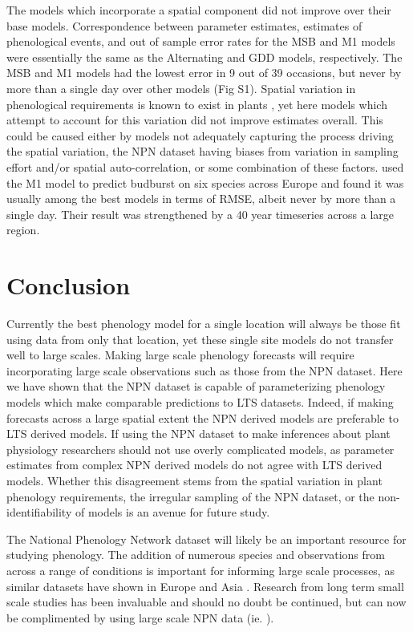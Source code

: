 \documentclass[fleqn,10pt,lineno]{wlpeerj} %
\begin{document}
The models which incorporate a spatial component did not improve over their base models. Correspondence between parameter estimates, estimates of phenological events, and out of sample error rates for the MSB and M1 models were essentially the same as the Alternating and GDD models, respectively. The MSB and M1 models had the lowest error in 9 out of 39 occasions, but never by more than a single day over other models (Fig S1). Spatial variation in phenological requirements is known to exist in plants \citep{zhang2017}, yet here models which attempt to account for this variation did not improve estimates overall. This could be caused either by models not adequately capturing the process driving the spatial variation, the NPN dataset having biases from variation in sampling effort and/or spatial auto-correlation, or some combination of these factors. \cite{basler2016} used the M1 model to predict budburst on six species across Europe and found it was usually among the best models in terms of RMSE, albeit never by more than a single day. Their result was strengthened by a 40 year timeseries across a large region.

\section*{Conclusion}

Currently the best phenology model for a single location will always be those fit using data from only that location, yet these single site models do not transfer well to large scales. Making large scale phenology forecasts will require incorporating large scale observations such as those from the NPN dataset. Here we have shown that the NPN dataset is capable of parameterizing phenology models which make comparable predictions to LTS datasets. Indeed, if making forecasts across a large spatial extent the NPN derived models are preferable to LTS derived models. If using the NPN dataset to make inferences about plant physiology researchers should not use overly complicated models, as parameter estimates from complex NPN derived models do not agree with LTS derived models. Whether this disagreement stems from the spatial variation in plant phenology requirements, the irregular sampling of the NPN dataset, or the non-identifiability of models is an avenue for future study. 

The National Phenology Network dataset will likely be an important resource for studying phenology.  The addition of numerous species and observations from across a range of conditions is important for informing large scale processes, as similar datasets have shown in Europe \citep{olsson2014, basler2016} and Asia \citep{xu2013, zhang2017}. Research from long term small scale studies has been invaluable and should no doubt be continued, but can now be complimented by using large scale NPN data (ie. \citep{jeong2013, melaas2016}).
\end{document}
